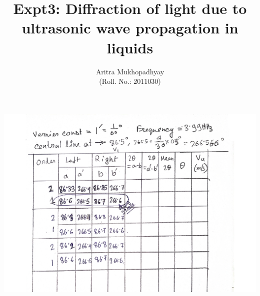 \documentclass[12pt]{article}
\title{\textbf{Expt3: Diffraction of light due to\\ultrasonic wave propagation in liquids}}
\author{Aritra Mukhopadhyay\\(Roll. No.: 2011030)}
\date{}
\begin{document}
	\maketitle
	\begin{multicols}{2}
		
		
		
	\end{multicols}
	
	
	\begin{multicols*}{2}
		

		
		
		\nocite{*}
	\end{multicols*}
	\pagebreak

	\includegraphics[width=\textwidth]{sections/Expt_3_data.pdf}
\end{document}
